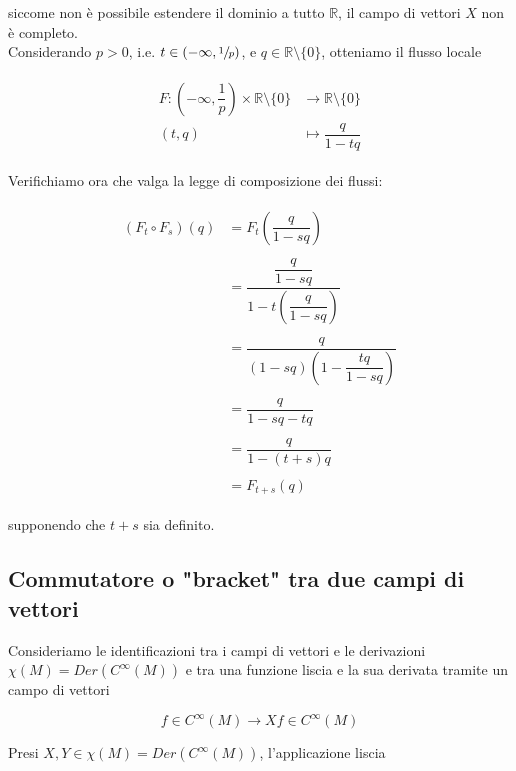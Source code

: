 siccome non è possibile estendere il dominio a tutto $ \mathbb{R} $, il campo di vettori $ X $ non è completo.\\
Considerando $ p>0 $, i.e. $ t \in (-\infty, \sfrac{1}{p}) $, e $ q \in \mathbb{R} \setminus \{0\} $, otteniamo il flusso locale

\begin{align}
	\begin{split}
		F : \left( -\infty, \dfrac{1}{p} \right) \times \mathbb{R} \setminus \{0\} &\to \mathbb{R} \setminus \{0\}\\
		(t,q) &\mapsto \dfrac{q}{1 - t q}
	\end{split}
\end{align}

Verifichiamo ora che valga la legge di composizione dei flussi:

\begin{align}
	\begin{split}
		(F_{t} \circ F_{s})(q) &= F_{t} \left( \dfrac{q}{1 - s q} \right)\\\\
		&= \dfrac{\dfrac{q}{1 - s q}}{1 - t \left( \dfrac{q}{1 - s q} \right)}\\\\
		&= \dfrac{q}{(1 - s q) \left(1 - \dfrac{t q}{1 - s q} \right)}\\\\
		&= \dfrac{q}{1 - s q - t q}\\\\
		&= \dfrac{q}{1 - (t+s) q}\\\\
		&= F_{t+s}(q)
	\end{split}
\end{align}

supponendo che $ t+s $ sia definito.

\subsection{Commutatore o "bracket" tra due campi di vettori}

Consideriamo le identificazioni tra i campi di vettori e le derivazioni $ \chi(M) = Der(C^{\infty}(M)) $ e tra una funzione liscia e la sua derivata tramite un campo di vettori

\begin{equation}
	f \in C^{\infty}(M) \to X f \in C^{\infty}(M)
\end{equation}

Presi $ X,Y \in \chi(M) = Der(C^{\infty}(M)) $, l'applicazione liscia


